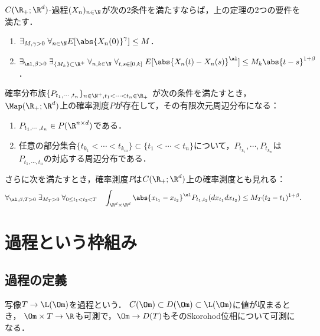 \documentclass[uplatex,dvipdfmx]{jsreport}
\begin{document}
\begin{proposition}[Kolmogorovの連続性定理]
    $C(\R_+;\R^d)$-過程$(X_n)_{n\in\N}$が次の2条件を満たすならば，上の定理の2つの要件を満たす．
    \begin{enumerate}
        \item $\exists_{M,\gamma>0}\;\forall_{n\in\N}E[\abs{X_n(0)}^\gamma]\le M$．
        \item $\exists_{\al,\beta>0}\;\exists_{\{M_k\}\subset\R^+}\;\forall_{n,k\in\N}\;\forall_{t,s\in[0,k]}\;E[\abs{X_n(t)-X_n(s)}^\al]\le M_k\abs{t-s}^{1+\beta}$．
    \end{enumerate}
\end{proposition}

\begin{corollary}[さらに一般の構成]
    確率分布族$\{P_{t_1,\cdots,t_n}\}_{n\in\N^+,t_1<\cdots<t_n\in\R_+}$
    が次の条件を満たすとき，$\Map(\R_+;\R^d)$上の確率測度$P$が存在して，その有限次元周辺分布になる：
    \begin{enumerate}[({C}1)]
        \item $P_{t_1,\cdots,t_n}\in P(\R^{n\times d})$である．
        \item 任意の部分集合$\{t_{k_1}<\cdots<t_{k_m}\}\subset\{t_1<\cdots<t_n\}$について，$P_{t_{k_1}},\cdots,P_{t_{k_m}}$は$P_{t_1,\cdots,t_n}$の対応する周辺分布である．
    \end{enumerate}
    さらに次を満たすとき，確率測度$P$は$C(\R_+;\R^d)$上の確率測度とも見れる：
    \[\forall_{\al,\beta,T>0}\;\exists_{M_T>0}\;\forall_{0\le t_1<t_2<T}\quad\int_{\R^d\times\R^d}\abs{x_{t_1}-x_{t_2}}^\al P_{t_1,t_2}(dx_{t_1}dx_{t_2})\le M_T(t_2-t_1)^{1+\beta}.\]
\end{corollary}

\section{過程という枠組み}

\subsection{過程の定義}

\begin{tcolorbox}[colframe=ForestGreen, colback=ForestGreen!10!white,breakable,colbacktitle=ForestGreen!40!white,coltitle=black,fonttitle=\bfseries\sffamily,
title=]
    写像$T\to \L(\Om)$を過程という．
    $C(\Om)\subset D(\Om)\subset \L(\Om)$に値が収まるとき，
    $\Om\times T\to\R$も可測で，$\Om\to D(T)$もそのSkorohod位相について可測になる．
\end{tcolorbox}
\end{document}
